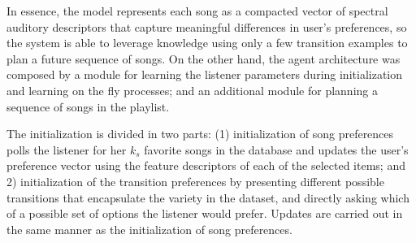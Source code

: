 In essence, the model represents each song as a compacted vector of spectral auditory descriptors that capture meaningful differences in user's preferences, so the system is able to leverage knowledge using only a few transition examples to plan a future sequence of songs. 
On the other hand, the agent architecture was composed by a module for learning the listener parameters 
during initialization and learning on the fly processes; and an additional module for planning a sequence of songs in the playlist. 

The initialization is divided in two parts: (1) initialization of song preferences polls the listener for her $k_s$ favorite songs in the database and updates the user's preference vector 
using the feature descriptors of each of the selected items; and 2) initialization of the transition preferences by presenting different possible transitions that encapsulate the variety in the dataset, and directly asking which of a possible set of options the listener would prefer. Updates are carried out in the same manner as the initialization of song preferences.

